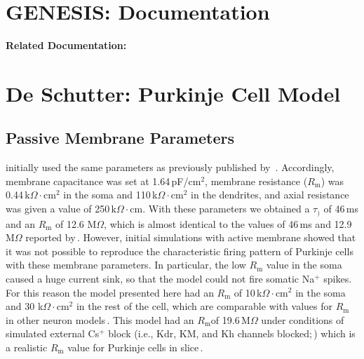 \documentclass[12pt]{article}
\begin{document}
\section*{GENESIS: Documentation}

{\bf Related Documentation:}

\section*{De Schutter: Purkinje Cell Model}

\subsection*{Passive Membrane Parameters}

initially used the same parameters as previously published by \,\cite{Rapp-M:1992kx}. 
Accordingly, membrane capacitance was set at
1.64\,pF/cm$^2$, membrane resistance ($R_{\mbox{m}}$) was 0.44\,k$\Omega\cdot$cm$^2$ in the
soma and 110\,k$\Omega\cdot$cm$^2$ in the dendrites, and axial resistance was
given a value of 250\,k$\Omega\cdot$cm. With these parameters we obtained a
$\tau_)$ of 46\,ms and an $R_{\mbox{m}}$ of 12.6 M$\Omega$, which is almost identical to the
values of 46\,ms and 12.9 M$\Omega$ reported by\,\cite{Rapp-M:1992kx}.
However, initial simulations with active membrane showed that it
was not possible to reproduce the characteristic firing pattern of
Purkinje cells with these membrane parameters. In particular, the
low $R_{\mbox{m}}$ value in the soma caused a huge current sink, so that the
model could not fire somatic Na$^+$ spikes. For this reason the
model presented here had an $R_{\mbox{m}}$ of 10\,k$\Omega\cdot$cm$^2$ in the soma and 
30 k$\Omega\cdot$cm$^2$ in the rest of the cell, which are comparable with values
for $R_{\mbox{m}}$ in other neuron models\,\cite{R:1992ys}. This
model had an $R_{\mbox{m}}$of 19.6\,M$\Omega$ 
under conditions of simulated external
Cs$^+$ block (i.e., Kdr, KM, and Kh channels blocked;\,\cite{Hille:1991zr}) 
which is a realistic $R_{\mbox{m}}$ value for Purkinje cells in slice\,\cite{R:1980ly}.



\end{document}
